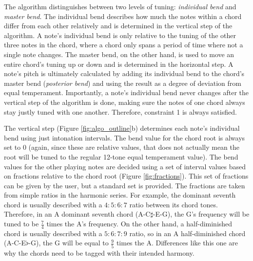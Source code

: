 \documentclass[a4paper]{article}
\begin{document}
The algorithm distinguishes between two levels of tuning: \textit{individual bend} and \textit{master bend}. The individual bend describes how much the notes within a chord differ from each other relatively and is determined in the vertical step of the algorithm. A note's individual bend is only relative to the tuning of the other three notes in the chord, where a chord only spans a period of time where not a single note changes. The master bend, on the other hand, is used to move an entire chord's tuning up or down and is determined in the horizontal step. A note's pitch is ultimately calculated by adding its individual bend to the chord's master bend (\textit{posterior bend}) and using the result as a degree of deviation from equal temperament. Importantly, a note's individual bend never changes after the vertical step of the algorithm is done, making sure the notes of one chord always stay justly tuned with one another. Therefore, constraint 1 is always satisfied.

The vertical step (Figure \ref{fig:algo_outline}b) determines each note's individual bend using just intonation intervals. The bend value for the chord root is always set to 0 (again, since these are relative values, that does not actually mean the root will be tuned to the regular 12-tone equal temperament value). The bend values for the other playing notes are decided using a set of interval values based on fractions relative to the chord root (Figure \ref{fig:fractions}). This set of fractions can be given by the user, but a standard set is provided. The fractions are taken from simple ratios in the harmonic series. For example, the dominant seventh chord is usually described with a $4:5:6:7$ ratio between its chord tones. Therefore, in an A dominant seventh chord (A-C$\sharp$-E-G), the G's frequency will be tuned to be $\frac74$ times the A's frequency. On the other hand, a half-diminished chord is usually described with a $5:6:7:9$ ratio, so in an A half-diminished chord (A-C-E$\flat$-G), the G will be equal to $\frac95$ times the A. Differences like this one are why the chords need to be tagged with their intended harmony.
\end{document}
